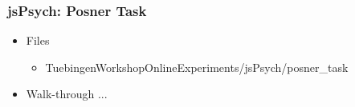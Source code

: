 \documentclass[t]{beamer}
\begin{document}
\begin{frame}[fragile]
    \frametitle{jsPsych: Posner Task}
    \begin{itemize}
        \item Files
            \begin{itemize}
                \item TuebingenWorkshopOnlineExperiments/jsPsych/posner\_task
            \end{itemize}
        \item Walk-through ... 
    \end{itemize}
\end{frame}

\end{document}
